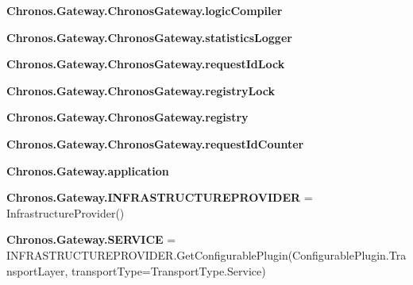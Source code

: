 \begin{DoxyCompactItemize}
\item 
{\bfseries Chronos.\+Gateway.\+Chronos\+Gateway.\+logic\+Compiler}\hypertarget{group__Chronos_ga14245fe27d5a3d22fe75d11417f03a04}{}\label{group__Chronos_ga14245fe27d5a3d22fe75d11417f03a04}

\item 
{\bfseries Chronos.\+Gateway.\+Chronos\+Gateway.\+statistics\+Logger}\hypertarget{group__Chronos_ga1f7c6670aac22f1cce91851df2bc166e}{}\label{group__Chronos_ga1f7c6670aac22f1cce91851df2bc166e}

\item 
{\bfseries Chronos.\+Gateway.\+Chronos\+Gateway.\+request\+Id\+Lock}\hypertarget{group__Chronos_gac660d28c2fda232b523185b87d98f828}{}\label{group__Chronos_gac660d28c2fda232b523185b87d98f828}

\item 
{\bfseries Chronos.\+Gateway.\+Chronos\+Gateway.\+registry\+Lock}\hypertarget{group__Chronos_gaa4f9e1b16949469a3079e2618f1a4385}{}\label{group__Chronos_gaa4f9e1b16949469a3079e2618f1a4385}

\item 
{\bfseries Chronos.\+Gateway.\+Chronos\+Gateway.\+registry}\hypertarget{group__Chronos_gaf4132d0e409be1204fe59f08c8f79160}{}\label{group__Chronos_gaf4132d0e409be1204fe59f08c8f79160}

\item 
{\bfseries Chronos.\+Gateway.\+Chronos\+Gateway.\+request\+Id\+Counter}\hypertarget{group__Chronos_gade7f28757e364fcddf0b50df6cf9f7fe}{}\label{group__Chronos_gade7f28757e364fcddf0b50df6cf9f7fe}

\item 
{\bfseries Chronos.\+Gateway.\+application}\hypertarget{group__Chronos_ga6e8a879818191e4e41dcc6fdd95b3447}{}\label{group__Chronos_ga6e8a879818191e4e41dcc6fdd95b3447}

\item 
{\bfseries Chronos.\+Gateway.\+I\+N\+F\+R\+A\+S\+T\+R\+U\+C\+T\+U\+R\+E\+P\+R\+O\+V\+I\+D\+ER} = Infrastructure\+Provider()\hypertarget{group__Chronos_ga223d4d79343bcea71213445eb8540cde}{}\label{group__Chronos_ga223d4d79343bcea71213445eb8540cde}

\item 
{\bfseries Chronos.\+Gateway.\+S\+E\+R\+V\+I\+CE} = I\+N\+F\+R\+A\+S\+T\+R\+U\+C\+T\+U\+R\+E\+P\+R\+O\+V\+I\+D\+E\+R.\+Get\+Configurable\+Plugin(Configurable\+Plugin.\+Transport\+Layer, transport\+Type=Transport\+Type.\+Service)\hypertarget{group__Chronos_ga23278b92f59126e9669805c3372c8b80}{}\label{group__Chronos_ga23278b92f59126e9669805c3372c8b80}


\end{DoxyCompactItemize}
